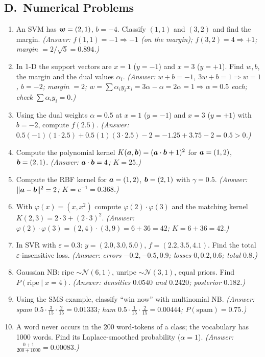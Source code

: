 \subsection*{D.\ Numerical Problems}
\begin{enumerate}
  \item An SVM has $\boldsymbol{w}=(2,1)$, $b=-4$. Classify $(1,1)$ and $(3,2)$ and find the margin. \textit{(Answer: $f(1,1)=-1\Rightarrow-1$ (on the margin); $f(3,2)=4\Rightarrow+1$; margin $=2/\sqrt5=0.894$.)}
  \item In 1-D the support vectors are $x=1$ ($y=-1$) and $x=3$ ($y=+1$). Find $w,b$, the margin and the dual values $\alpha_i$. \textit{(Answer: $w+b=-1$, $3w+b=1\Rightarrow w=1$, $b=-2$; margin $=2$; $w=\sum\alpha_iy_ix_i=3\alpha-\alpha=2\alpha=1\Rightarrow\alpha=0.5$ each; check $\sum\alpha_iy_i=0$.)}
  \item Using the dual weights $\alpha=0.5$ at $x=1$ ($y=-1$) and $x=3$ ($y=+1$) with $b=-2$, compute $f(2.5)$. \textit{(Answer: $0.5(-1)(1\cdot2.5)+0.5(1)(3\cdot2.5)-2=-1.25+3.75-2=0.5>0$.)}
  \item Compute the polynomial kernel $K(\boldsymbol{a},\boldsymbol{b})=(\boldsymbol{a}\cdot\boldsymbol{b}+1)^2$ for $\boldsymbol{a}=(1,2)$, $\boldsymbol{b}=(2,1)$. \textit{(Answer: $\boldsymbol{a}\cdot\boldsymbol{b}=4$; $K=25$.)}
  \item Compute the RBF kernel for $\boldsymbol{a}=(1,2)$, $\boldsymbol{b}=(2,1)$ with $\gamma=0.5$. \textit{(Answer: $\|\boldsymbol{a}-\boldsymbol{b}\|^2=2$; $K=e^{-1}=0.368$.)}
  \item With $\varphi(x)=(x,x^2)$ compute $\varphi(2)\cdot\varphi(3)$ and the matching kernel $K(2,3)=2\cdot3+(2\cdot3)^2$. \textit{(Answer: $\varphi(2)\cdot\varphi(3)=(2,4)\cdot(3,9)=6+36=42$; $K=6+36=42$.)}
  \item In SVR with $\varepsilon=0.3$: $y=(2.0,3.0,5.0)$, $f=(2.2,3.5,4.1)$. Find the total $\varepsilon$-insensitive loss. \textit{(Answer: errors $-0.2,-0.5,0.9$; losses $0,0.2,0.6$; total $0.8$.)}
  \item Gaussian NB: ripe $\sim\mathcal N(6,1)$, unripe $\sim\mathcal N(3,1)$, equal priors. Find $P(\text{ripe}\mid x=4)$. \textit{(Answer: densities $0.0540$ and $0.2420$; posterior $0.182$.)}
  \item Using the SMS example, classify ``win now'' with multinomial NB. \textit{(Answer: spam $0.5\cdot\frac3{15}\cdot\frac2{15}=0.01333$; ham $0.5\cdot\frac1{15}\cdot\frac2{15}=0.00444$; $P(\text{spam})=0.75$.)}
  \item A word never occurs in the 200 word-tokens of a class; the vocabulary has 1000 words. Find its Laplace-smoothed probability ($\alpha=1$). \textit{(Answer: $\frac{0+1}{200+1000}=0.00083$.)}
\end{enumerate}

